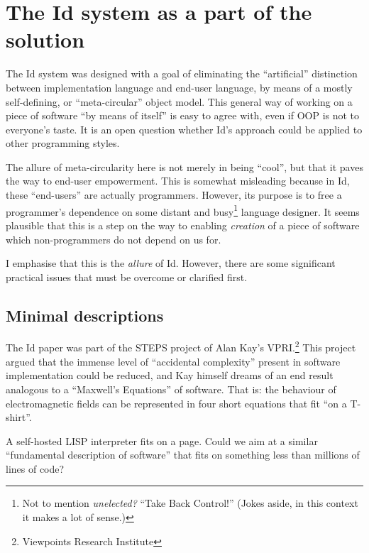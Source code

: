 \hypertarget{the-id-system-as-a-part-of-the-solution}{%
\section{The Id system as a part of the
solution}\label{the-id-system-as-a-part-of-the-solution}}

The Id{} system was designed with a goal of eliminating the
``artificial'' distinction between implementation language and end-user
language, by means of a mostly self-defining, or ``meta-circular''
object model. This general way of working on a piece of software ``by
means of itself'' is easy to agree with, even if OOP is not to
everyone's taste. It is an open question whether Id{}'s approach could
be applied to other programming styles.

The allure of meta-circularity here is not merely in being ``cool'', but
that it paves the way to end-user empowerment. This is somewhat
misleading because in Id{}, these ``end-users'' are actually
programmers. However, its purpose is to free a programmer's dependence
on some distant and busy\footnote{Not to mention \emph{unelected?}
  ``Take Back Control!'' (Jokes aside, in this context it makes a lot of
  sense.)} language designer. It seems plausible that this is a step on
the way to enabling \emph{creation} of a piece of software which
non-programmers do not depend on us for.

I emphasise that this is the \emph{allure} of Id{}. However, there are
some significant practical issues that must be overcome or clarified
first.

\hypertarget{minimal-descriptions}{%
\subsection{Minimal descriptions}\label{minimal-descriptions}}

The Id{} paper was part of the STEPS project of Alan Kay's
VPRI.\footnote{Viewpoints Research Institute} This project argued that
the immense level of ``accidental complexity'' present in software
implementation could be reduced, and Kay himself dreams of an end result
analogous to a ``Maxwell's Equations'' of software. That is: the
behaviour of electromagnetic fields can be represented in four short
equations that fit ``on a T-shirt''.

A self-hosted LISP interpreter fits on a page. Could we aim at a similar
``fundamental description of software'' that fits on something less than
millions of lines of code?

